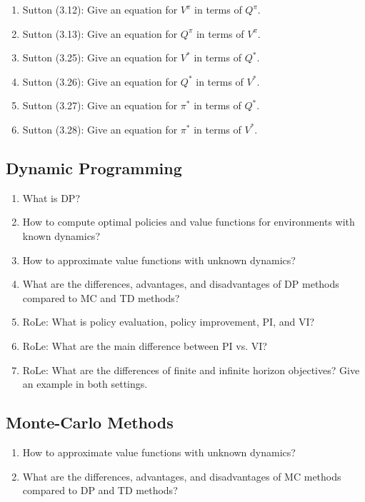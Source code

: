 \begin{enumerate}
				\item Sutton (3.12): Give an equation for \(V^\pi\) in terms of \(Q^\pi\).
				\item Sutton (3.13): Give an equation for \(Q^\pi\) in terms of \(V^\pi\).
				\item Sutton (3.25): Give an equation for \(V^\ast\) in terms of \(Q^\ast\).
				\item Sutton (3.26): Give an equation for \(Q^\ast\) in terms of \(V^\ast\).
				\item Sutton (3.27): Give an equation for \(\pi^\ast\) in terms of \(Q^\ast\).
				\item Sutton (3.28): Give an equation for \(\pi^\ast\) in terms of \(V^\ast\).
			\end{enumerate}

		\subsection{Dynamic Programming}
			\begin{enumerate}
				\item What is \ac{DP}?
				\item How to compute optimal policies and value functions for environments with known dynamics?
				\item How to approximate value functions with unknown dynamics?
				\item What are the differences, advantages, and disadvantages of \ac{DP} methods compared to \ac{MC} and \ac{TD} methods?
				\item RoLe: What is policy evaluation, policy improvement, \ac{PI}, and \ac{VI}?
				\item RoLe: What are the main difference between \ac{PI} vs. \ac{VI}?
				\item RoLe: What are the differences of finite and infinite horizon objectives? Give an example in both settings.
			\end{enumerate}

		\subsection{Monte-Carlo Methods}
			\begin{enumerate}
				\item How to approximate value functions with unknown dynamics?
				\item What are the differences, advantages, and disadvantages of \ac{MC} methods compared to \ac{DP} and \ac{TD} methods?
			\end{enumerate}

